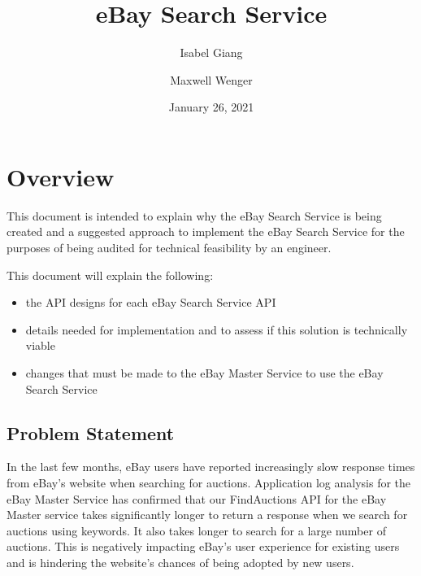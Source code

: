 \documentclass[12pt,a4paper]{article}
\title{eBay Search Service}
\author{Isabel Giang}
\author{Maxwell Wenger}
\affil{CSS490 Group Y4}
\date{January 26, 2021}
\begin{document}
\maketitle
\setcounter{tocdepth}{3}
\tableofcontents



\pagebreak
\section{Overview}

This document is intended to explain why the eBay Search Service is being created
and a suggested approach to implement the eBay Search Service for the purposes
of being audited for technical feasibility by an engineer.

\vspace{\baselineskip}

This document will explain the following:

\begin{itemize}
    \item the API designs for each eBay Search Service API
    \item details needed for implementation and to assess if this solution is technically viable
    \item changes that must be made to the eBay Master Service to use the eBay Search Service
\end{itemize} 


\subsection{Problem Statement}
In the last few months, eBay users have reported increasingly slow response
times from eBay's website when searching for auctions. Application log analysis
for the eBay Master Service has confirmed that our FindAuctions API for the
eBay Master service takes significantly longer to return a response when we
search for auctions using keywords. It also takes longer to search for a large
number of auctions.
\vspace{\baselineskip}
This is negatively impacting eBay's user experience for existing users and is
hindering the website's chances of being adopted by new users.
\end{document}
